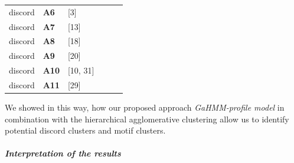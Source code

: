 \begin{table}[htbp]
\begin{tabular}{|l|l|l|rrr}
\cline{1-3}    discord & \cellcolor[rgb]{ .949,  .949,  .949} \textbf{A6} & [3]  &      &      &  \bigstrut\\
\cline{1-3}    discord & \cellcolor[rgb]{ .949,  .949,  .949} \textbf{A7} & [13]  &      &      &  \bigstrut\\
\cline{1-3}    discord & \cellcolor[rgb]{ .949,  .949,  .949} \textbf{A8} & [18]  &      &      &  \bigstrut\\
\cline{1-3}    discord & \cellcolor[rgb]{ .949,  .949,  .949} \textbf{A9} & [20]  &      &      &  \bigstrut\\
\cline{1-3}    discord & \cellcolor[rgb]{ .949,  .949,  .949} \textbf{A10} & [10, 31]  &      &      &  \bigstrut\\
\cline{1-3}    discord & \cellcolor[rgb]{ .949,  .949,  .949} \textbf{A11} & [29]  &      &      &  \bigstrut\\
\cline{1-3}    \end{tabular}%
  \label{tab:h_cluster_all}%
\end{table}%


We showed in this way, how our proposed approach \textit{GaHMM-profile model} in combination with the hierarchical agglomerative clustering allow us to identify potential discord clusters and motif clusters. \\


\subparagraph{\textit{Interpretation of the results}} 

